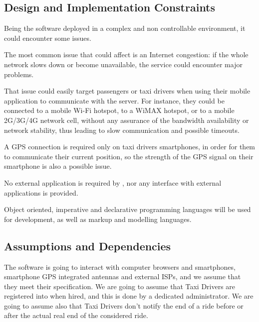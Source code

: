 \subsection{Design and Implementation Constraints}
Being the software deployed in a complex and non controllable environment, it could encounter some issues.\par
The most common issue that could affect \myTaxiService{} is an Internet congestion: if the whole network slows down or become unavailable, the service could encounter major problems.\par
That issue could easily target passengers or taxi drivers when using their mobile application to communicate with the server.
For instance, they could be connected to a mobile Wi-Fi hotspot, to a WiMAX hotspot, or to a mobile 2G/3G/4G network cell, without any assurance of the bandwidth availability or network stability, thus leading to slow communication and possible timeouts.\par
A GPS connection is required only on taxi drivers smartphones, in order for them to communicate their current position, so the strength of the GPS signal on their smartphone is also a possible issue.\par
No external application is required by \myTaxiService{}, nor any interface with external applications is provided.\par
Object oriented, imperative and declarative programming languages will be used for \myTaxiService{} development, as well as markup and modelling languages.\par
\subsection{Assumptions and Dependencies}
The software is going to interact with computer browsers and smartphones, smartphone GPS integrated antennas and external ISPs, and we assume that they meet their specification.
We are going to assume that Taxi Drivers are registered into \myTaxiSerice{} when hired, and this is done by a dedicated administrator.
We are going to assume also that Taxi Drivers don't notify the end of a ride before or after the actual real end of the considered ride.